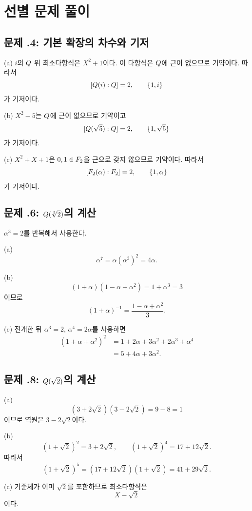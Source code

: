 \section{선별 문제 풀이}
\label{sec:field-extension-solutions}

\subsection*{문제 \thechapter.4: 기본 확장의 차수와 기저}

\begin{solution}
(a) $i$의 $Q$ 위 최소다항식은 $X^2+1$이다. 이 다항식은 $Q$에 근이 없으므로 기약이다. 따라서
\[
  [Q(i):Q]=2,
  \qquad
  \{1,i\}
\]
가 기저이다.

(b) $X^2-5$는 $Q$에 근이 없으므로 기약이고
\[
  [Q(\sqrt5):Q]=2,
  \qquad
  \{1,\sqrt5\}
\]
가 기저이다.

(c) $X^2+X+1$은 $0,1\in F_2$을 근으로 갖지 않으므로 기약이다. 따라서
\[
  [F_2(\alpha):F_2]=2,
  \qquad
  \{1,\alpha\}
\]
가 기저이다.
\end{solution}

\subsection*{문제 \thechapter.6: $Q(\sqrt[3]{2})$의 계산}

\begin{solution}
$\alpha^3=2$를 반복해서 사용한다.

(a)
\[
  \alpha^7=\alpha(\alpha^3)^2=4\alpha.
\]

(b)
\[
  (1+\alpha)(1-\alpha+\alpha^2)=1+\alpha^3=3
\]
이므로
\[
  (1+\alpha)^{-1}=\frac{1-\alpha+\alpha^2}{3}.
\]

(c) 전개한 뒤 $\alpha^3=2$, $\alpha^4=2\alpha$를 사용하면
\[
\begin{aligned}
 (1+\alpha+\alpha^2)^2
 &=1+2\alpha+3\alpha^2+2\alpha^3+\alpha^4\\
 &=5+4\alpha+3\alpha^2.
\end{aligned}
\]
\end{solution}

\subsection*{문제 \thechapter.8: $Q(\sqrt2)$의 계산}

\begin{solution}
(a)
\[
  (3+2\sqrt2)(3-2\sqrt2)=9-8=1
\]
이므로 역원은 $3-2\sqrt2$이다.

(b)
\[
  (1+\sqrt2)^2=3+2\sqrt2,
  \qquad
  (1+\sqrt2)^4=17+12\sqrt2.
\]
따라서
\[
  (1+\sqrt2)^5=(17+12\sqrt2)(1+\sqrt2)
  =41+29\sqrt2.
\]

(c) 기준체가 이미 $\sqrt2$를 포함하므로 최소다항식은
\[
  X-\sqrt2
\]
이다.
\end{solution}

